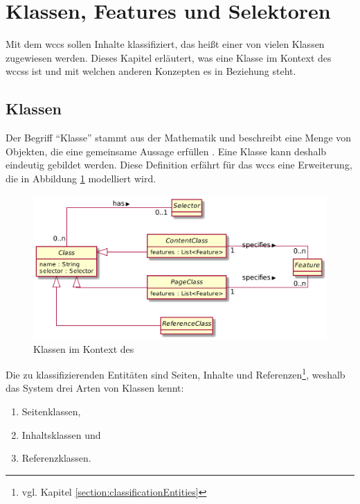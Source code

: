\section{Klassen, Features und Selektoren}
    \label{section:conceptClassesFeaturesSelectors}
    Mit dem \gls{wccs} sollen Inhalte klassifiziert,
    das heißt einer von vielen Klassen zugewiesen werden.
    Dieses Kapitel erläutert, was eine Klasse im Kontext des \glspl{wccs} ist
    und mit welchen anderen Konzepten es in Beziehung steht.

    \subsection{Klassen}
        Der Begriff "`Klasse"' stammt aus der Mathematik und beschreibt eine Menge von Objekten,
        die eine gemeinsame Aussage erfüllen \cite{oberschelp:Mengenlehre}.
        Eine Klasse kann deshalb eindeutig gebildet werden.
        Diese Definition erfährt für das \gls{wccs} eine Erweiterung,
        die in Abbildung \ref{image:conceptClasses} modelliert wird.

        \begin{figure}[htb]
            \centering
            \includegraphics[width=\textwidth]{../resources/concept/classes.png}
            \caption{Klassen im Kontext des }
            \label{image:conceptClasses}
        \end{figure}

        Die zu klassifizierenden Entitäten sind Seiten, Inhalte und
        Referenzen\footnote{vgl. Kapitel \ref{section:classificationEntities}},
        weshalb das System drei Arten von Klassen kennt:

        \begin{enumerate}
            \item Seitenklassen,
            \item Inhaltsklassen und
            \item Referenzklassen.
        \end{enumerate}

